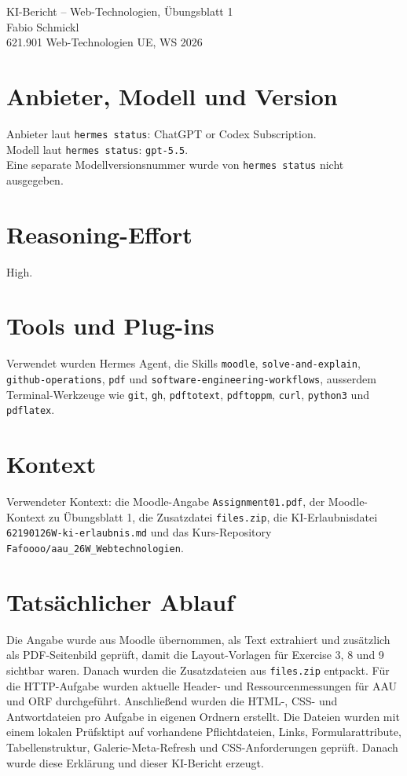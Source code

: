 \documentclass[11pt,a4paper]{article}
\begin{document}
\begin{center}
{\Large KI-Bericht -- Web-Technologien, Übungsblatt 1}\\
Fabio Schmickl\\
621.901 Web-Technologien UE, WS 2026
\end{center}

\section*{Anbieter, Modell und Version}
Anbieter laut \texttt{hermes status}: ChatGPT or Codex Subscription.\\
Modell laut \texttt{hermes status}: \texttt{gpt-5.5}.\\
Eine separate Modellversionsnummer wurde von \texttt{hermes status} nicht ausgegeben.

\section*{Reasoning-Effort}
High.

\section*{Tools und Plug-ins}
Verwendet wurden Hermes Agent, die Skills \texttt{moodle}, \texttt{solve-and-explain}, \texttt{github-operations}, \texttt{pdf} und \texttt{software-engineering-workflows}, ausserdem Terminal-Werkzeuge wie \texttt{git}, \texttt{gh}, \texttt{pdftotext}, \texttt{pdftoppm}, \texttt{curl}, \texttt{python3} und \texttt{pdflatex}.

\section*{Kontext}
Verwendeter Kontext: die Moodle-Angabe \texttt{Assignment01.pdf}, der Moodle-Kontext zu Übungsblatt 1, die Zusatzdatei \texttt{files.zip}, die KI-Erlaubnisdatei \texttt{62190126W-ki-erlaubnis.md} und das Kurs-Repository \texttt{Fafoooo/aau\_26W\_Webtechnologien}.

\section*{Tatsächlicher Ablauf}
Die Angabe wurde aus Moodle übernommen, als Text extrahiert und zusätzlich als PDF-Seitenbild geprüft, damit die Layout-Vorlagen für Exercise 3, 8 und 9 sichtbar waren. Danach wurden die Zusatzdateien aus \texttt{files.zip} entpackt. Für die HTTP-Aufgabe wurden aktuelle Header- und Ressourcenmessungen für AAU und ORF durchgeführt. Anschließend wurden die HTML-, CSS- und Antwortdateien pro Aufgabe in eigenen Ordnern erstellt. Die Dateien wurden mit einem lokalen Prüfsktipt auf vorhandene Pflichtdateien, Links, Formularattribute, Tabellenstruktur, Galerie-Meta-Refresh und CSS-Anforderungen geprüft. Danach wurde diese Erklärung und dieser KI-Bericht erzeugt.
\end{document}
